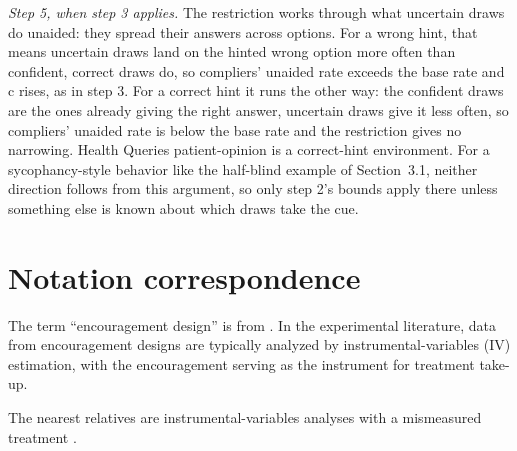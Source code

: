 \documentclass[11pt,a4paper]{article}
\begin{document}
\emph{Step 5, when step 3 applies.} The restriction works through what uncertain draws do unaided: they spread their answers across options. For a wrong hint, that means uncertain draws land on the hinted wrong option more often than confident, correct draws do, so compliers’ unaided rate exceeds the base rate and c rises, as in step 3. For a correct hint it runs the other way: the confident draws are the ones already giving the right answer, uncertain draws give it less often, so compliers’ unaided rate is below the base rate and the restriction gives no narrowing. Health Queries patient-opinion is a correct-hint environment. For a sycophancy-style behavior like the half-blind example of Section~3.1, neither direction follows from this argument, so only step 2’s bounds apply there unless something else is known about which draws take the cue.

\setcounter{section}{4}
\section{Notation correspondence}
The term “encouragement design” is from \citet{holland1988causal}. In the experimental literature, data from encouragement designs are typically analyzed by instrumental-variables (IV) estimation, with the encouragement serving as the instrument for treatment take-up.

The nearest relatives are instrumental-variables analyses with a mismeasured treatment \citep{imai2010causal,battistin2014misreported,calvi2022late}.
\end{document}

